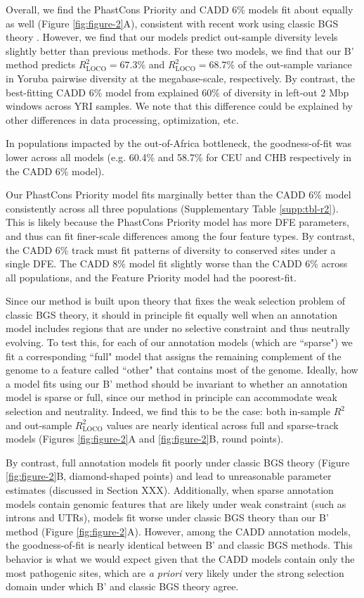 \documentclass[11pt]{article}
\begin{document}
Overall, we find the PhastCons Priority and CADD 6\% models fit about equally
as well (Figure \ref{fig:figure-2}A), consistent with recent work using classic
BGS theory \parencite{Murphy2022-sj}. However, we find that our models predict
out-sample diversity levels slightly better than previous methods. For these
two models, we find that our B' method predicts $R_\text{LOCO}^2=67.3$\% and
$R_\text{LOCO}^2=68.7$\% of the out-sample variance in Yoruba pairwise
diversity at the megabase-scale, respectively. By contrast, the best-fitting
CADD 6\% model from \textcite{Murphy2022-sj} explained 60\% of diversity in
left-out 2 Mbp windows across YRI samples. We note that this difference could
be explained by other differences in data processing, optimization, etc.

In populations impacted by the out-of-Africa bottleneck, the goodness-of-fit
was lower across all models (e.g. 60.4\% and 58.7\% for CEU and CHB
respectively in the CADD 6\% model). 


Our PhastCons Priority model fits
marginally better than the CADD 6\% model consistently across all three
populations (Supplementary Table \ref{supp:tbl-r2}). This is likely because the
PhastCons Priority model has more DFE parameters, and thus can fit finer-scale
differences among the four feature types. By contrast, the CADD 6\% track must
fit patterns of diversity to conserved sites under a single DFE. The CADD 8\%
model fit slightly worse than the CADD 6\% across all populations, and the
Feature Priority model had the poorest-fit.

Since our method is built upon theory that fixes the weak selection problem of
classic BGS theory, it should in principle fit equally well when an annotation
model includes regions that are under no selective constraint and thus
neutrally evolving. To test this, for each of our annotation models (which are
``sparse") we fit a corresponding ``full" model that assigns the remaining
complement of the genome to a feature called ``other" that contains most of the
genome. Ideally, how a model fits using our B' method should be invariant to
whether an annotation model is sparse or full, since our method in principle
can accommodate weak selection and neutrality. Indeed, we find this to be the
case: both in-sample $R^2$ and out-sample $R_\text{LOCO}^2$ values are nearly
identical across full and sparse-track models (Figures \ref{fig:figure-2}A and
\ref{fig:figure-2}B, round points). 

By contrast, full annotation models fit poorly under classic BGS theory (Figure
\ref{fig:figure-2}B, diamond-shaped points) and lead to unreasonable parameter
estimates (discussed in Section XXX). Additionally, when sparse annotation
models contain genomic features that are likely under weak constraint (such as
introns and UTRs), models fit worse under classic BGS theory than our B' method
(Figure \ref{fig:figure-2}A). However, among the CADD annotation models, the
goodness-of-fit is nearly identical between B' and classic BGS methods. This
behavior is what we would expect given that the CADD models contain only the
most pathogenic sites, which are \emph{a priori} very likely under the strong
selection domain under which B' and classic BGS theory agree.
\end{document}
